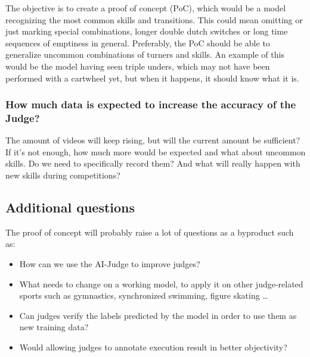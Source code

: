 The objective is to create a proof of concept (PoC), which would be a model recognizing the most common skills and transitions.
This could mean omitting or just marking special combinations, longer double dutch switches or long time sequences of emptiness in general. Preferably, the PoC should be able to generalize uncommon combinations of turners and skills. An example of this would be the model having seen triple unders, which may not have been performed with a cartwheel yet, but when it happens, it should know what it is.

\subsubsection{How much data is expected to increase the accuracy of the Judge?}
\label{intro-bp:question-expected-data-to-increase-accuracy}

The amount of videos will keep rising, but will the current amount be sufficient? If it's not enough, how much more would be expected and what about uncommon skills. Do we need to specifically record them? And what will really happen with new skills during competitions?

\subsection{Additional questions}
\label{intro-bp:question-additional}

The proof of concept will probably raise a lot of questions as a byproduct such as:

\begin{itemize}
    \item How can we use the AI-Judge to improve judges?
    \item What needs to change on a working model, to apply it on other judge-related sports such as gymnastics, synchronized swimming, figure skating \dots
    \item Can judges verify the labels predicted by the model in order to use them as new training data?
    \item Would allowing judges to annotate execution result in better objectivity?
\end{itemize}


\section{}%
\label{sec:opzet-bachelorproef}

